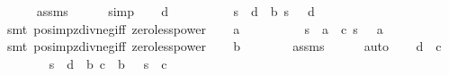 \begin{isabellebody}
\ \ \ \ \isamarkupfalse%
\ assms\isanewline
\ \ \ \ \isamarkupfalse%
\ simp\isanewline
\isanewline
\ \ \isamarkupfalse%
\ {\isachardoublequoteopen}d\ {\isachargreater}\ {}{\isachardoublequoteclose}\isanewline
\ \ \ \ \isamarkupfalse%
\ {\isacharbackquoteopen}{}\ {\isacharasterisk}\ s\ {\isacharequal}\ d{\isacharcircum}{}\ {\isacharminus}\ b{\isacharcircum}{}{\isacharbackquoteclose}\ {\isacharbackquoteopen}s\ {\isachargreater}\ {}{\isacharbackquoteclose}\ {\isacharbackquoteopen}d\ {\isasymge}\ {}{\isacharbackquoteclose}\isanewline
\ \ \ \ \isamarkupfalse%
\ {\isacharparenleft}smt\ pos{\isacharunderscore}imp{\isacharunderscore}zdiv{\isacharunderscore}neg{\isacharunderscore}iff\ zero{\isacharunderscore}less{\isacharunderscore}power{}{\isacharparenright}\isanewline
\isanewline
\ \ \isamarkupfalse%
\ {\isachardoublequoteopen}a\ {\isachargreater}\ {}{\isachardoublequoteclose}\isanewline
\ \ \ \ \isamarkupfalse%
\ {\isacharbackquoteopen}{}\ {\isacharasterisk}\ s\ {\isacharequal}\ a{\isacharcircum}{}\ {\isacharminus}\ c{\isacharcircum}{}{\isacharbackquoteclose}\ {\isacharbackquoteopen}s\ {\isachargreater}\ {}{\isacharbackquoteclose}\ {\isacharbackquoteopen}a\ {\isasymge}\ {}{\isacharbackquoteclose}\isanewline
\ \ \ \ \isamarkupfalse%
\ {\isacharparenleft}smt\ pos{\isacharunderscore}imp{\isacharunderscore}zdiv{\isacharunderscore}neg{\isacharunderscore}iff\ zero{\isacharunderscore}less{\isacharunderscore}power{}{\isacharparenright}\isanewline
\isanewline
\ \ \isamarkupfalse%
\ {\isachardoublequoteopen}b\ {\isachargreater}\ {}{\isachardoublequoteclose}\isanewline
\ \ \ \ \isamarkupfalse%
\ assms\isanewline
\ \ \ \ \isamarkupfalse%
\ auto\isanewline
\isanewline
\ \ \isamarkupfalse%
\ {\isachardoublequoteopen}d{\isacharcircum}{}\ {\isachargreater}\ c{\isacharcircum}{}{\isachardoublequoteclose}\isanewline
\ \ \ \ \isamarkupfalse%
\ {\isacartoucheopen}{}\ {\isacharasterisk}\ s\ {\isacharequal}\ d\ {\isacharminus}\ b\ {\isacharbackquoteopen}c\ {\isasymle}\ b{\isacharbackquoteclose}\ {\isacharbackquoteopen}{}\ {\isacharless}\ s{\isacharbackquoteclose}\ \ {\isacharbackquoteopen}c\ {\isasymge}\ {}{\isacharbackquoteclose}\isanewline

\end{isabellebody}
